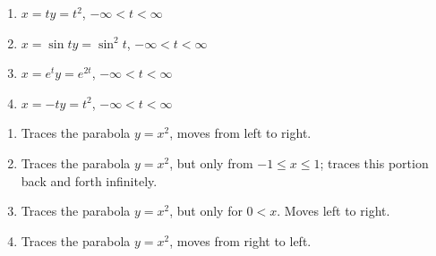 {\begin{enumerate}
\item		$x=t$\quad $y=t^2$, \quad $-\infty< t< \infty$
\item		$x=\sin t$\quad $y=\sin^2t$, \quad $-\infty< t< \infty$
\item		$x=e^t$\quad $y=e^{2t}$, \quad $-\infty< t< \infty$
\item		$x=-t$\quad $y=t^2$, \quad $-\infty< t< \infty$
\end{enumerate}
}
{\begin{enumerate}
	\item Traces the parabola $y=x^2$, moves from left to right.
	\item	Traces the parabola $y=x^2$, but only from $-1\leq x\leq 1$; traces this portion back and forth infinitely.
	\item	Traces the parabola $y=x^2$, but only for $0<x$. Moves left to right.
	\item	Traces the parabola $y=x^2$, moves from right to left.
\end{enumerate}
}